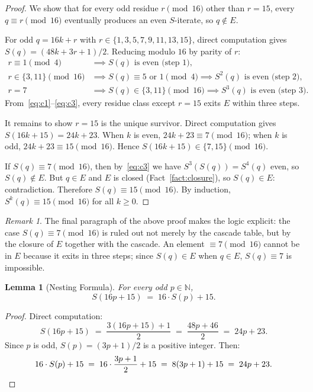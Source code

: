 \documentclass{amsart}
\newtheorem{lemma}[theorem]{Lemma}
\theoremstyle{definition}
\theoremstyle{remark}
\newtheorem{remark}[theorem]{Remark}
\newcommand{\N}{\mathbb{N}}
\begin{document}
\begin{proof}
We show that for every odd residue $r\pmod{16}$ other than $r=15$, every
$q\equiv r\pmod{16}$ eventually produces an even $S$-iterate, so $q\notin E$.

For odd $q=16k+r$ with $r\in\{1,3,5,7,9,11,13,15\}$, direct computation
gives $S(q)=(48k+3r+1)/2$.
Reducing modulo $16$ by parity of $r$:
\begin{align}
  r\equiv 1\pmod{4}
    &\implies S(q) \text{ is even (step 1)},  \label{eq:c1} \\
  r\in\{3,11\}\pmod{16}
    &\implies S(q)\equiv 5\text{ or }1\pmod{4}
     \implies S^2(q) \text{ is even (step 2)},  \label{eq:c2} \\
  r=7
    &\implies S(q)\in\{3,11\}\pmod{16}
     \implies S^3(q) \text{ is even (step 3)}.  \label{eq:c3}
\end{align}
From~\eqref{eq:c1}--\eqref{eq:c3}, every residue class except $r=15$
exits $E$ within three steps.

It remains to show $r=15$ is the unique survivor.
Direct computation gives $S(16k+15)=24k+23$.
When $k$ is even, $24k+23\equiv 7\pmod{16}$; when $k$ is odd,
$24k+23\equiv 15\pmod{16}$.
Hence $S(16k+15)\in\{7,15\}\pmod{16}$.

If $S(q)\equiv 7\pmod{16}$, then by~\eqref{eq:c3} we have
$S^3(S(q))=S^4(q)$ even, so $S(q)\notin E$.
But $q\in E$ and $E$ is closed (Fact~\ref{fact:closure}), so $S(q)\in E$:
contradiction.
Therefore $S(q)\equiv 15\pmod{16}$.
By induction, $S^k(q)\equiv 15\pmod{16}$ for all $k\ge 0$.
\end{proof}

\begin{remark}
The final paragraph of the above proof makes the logic explicit: the case
$S(q)\equiv 7\pmod{16}$ is ruled out not merely by the cascade table, but
by the closure of $E$ together with the cascade.
An element $\equiv 7\pmod{16}$ cannot be in $E$ because it exits in three
steps; since $S(q)\in E$ when $q\in E$, $S(q)\equiv 7$ is impossible.
\end{remark}

\begin{lemma}[Nesting Formula]
\label{lem:nesting}
For every odd $p\in\N$,
\[
  S(16p+15) \;=\; 16\cdot S(p)+15.
\]
\end{lemma}

\begin{proof}
Direct computation:
\[
  S(16p+15) \;=\; \frac{3(16p+15)+1}{2} \;=\; \frac{48p+46}{2} \;=\; 24p+23.
\]
Since $p$ is odd, $S(p)=(3p+1)/2$ is a positive integer.
Then:
\[
  16\cdot S(p)+15 \;=\; 16\cdot\frac{3p+1}{2}+15 \;=\; 8(3p+1)+15 \;=\; 24p+23.
\qedhere
\]
\end{proof}
\end{document}

